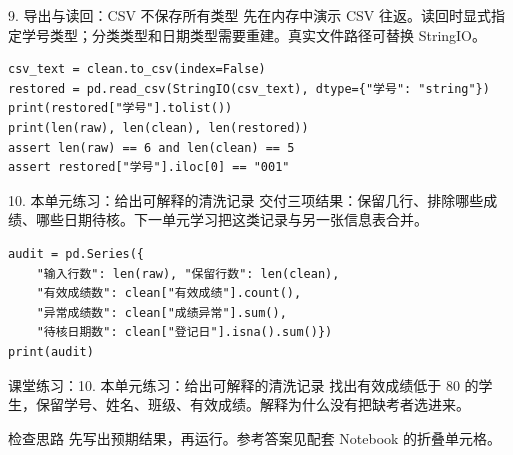 \begin{frame}[fragile]{9. 导出与读回：CSV 不保存所有类型}
\small 先在内存中演示 CSV 往返。读回时显式指定学号类型；分类类型和日期类型需要重建。真实文件路径可替换 StringIO。
\medskip
\begin{lstlisting}
csv_text = clean.to_csv(index=False)
restored = pd.read_csv(StringIO(csv_text), dtype={"学号": "string"})
print(restored["学号"].tolist())
print(len(raw), len(clean), len(restored))
assert len(raw) == 6 and len(clean) == 5
assert restored["学号"].iloc[0] == "001"
\end{lstlisting}
\end{frame}

\begin{frame}[fragile]{10. 本单元练习：给出可解释的清洗记录}
\small 交付三项结果：保留几行、排除哪些成绩、哪些日期待核。下一单元学习把这类记录与另一张信息表合并。
\medskip
\begin{lstlisting}
audit = pd.Series({
    "输入行数": len(raw), "保留行数": len(clean),
    "有效成绩数": clean["有效成绩"].count(),
    "异常成绩数": clean["成绩异常"].sum(),
    "待核日期数": clean["登记日"].isna().sum()})
print(audit)
\end{lstlisting}
\end{frame}
\begin{frame}[fragile]{课堂练习：10. 本单元练习：给出可解释的清洗记录}
找出有效成绩低于 80 的学生，保留学号、姓名、班级、有效成绩。解释为什么没有把缺考者选进来。
\medskip
\begin{block}{检查思路}
先写出预期结果，再运行。参考答案见配套 Notebook 的折叠单元格。
\end{block}
\end{frame}
